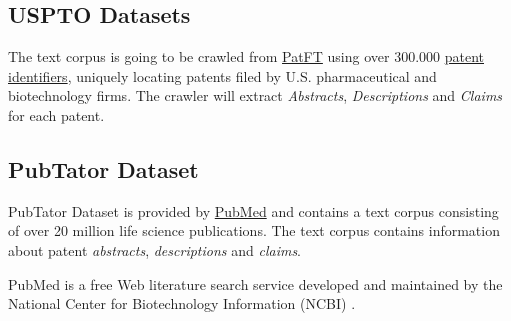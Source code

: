 \subsection{USPTO Datasets}
\label{usptods}
The text corpus is going to be crawled from \href{http://patft.uspto.gov/netahtml/PTO/index.html}{PatFT} using over 300.000 \href{https://nahorgebre.s3.amazonaws.com/US_Patents_1985_2016_313392.csv}{patent identifiers}, uniquely locating patents filed by U.S. pharmaceutical and biotechnology firms. The crawler will extract \textit{Abstracts}, \textit{Descriptions} and \textit{Claims} for each patent.

\subsection{PubTator Dataset}
\label{pubtator}
PubTator Dataset is provided by \href{https://www.ncbi.nlm.nih.gov/pubmed/}{PubMed} and contains a text corpus consisting of over 20 million life science publications. The text corpus contains information about patent \textit{abstracts}, \textit{descriptions} and \textit{claims}. 

PubMed is a free Web literature search service developed and maintained by the National Center for Biotechnology Information (NCBI) \cite{Lu2011PubMedAB}.
